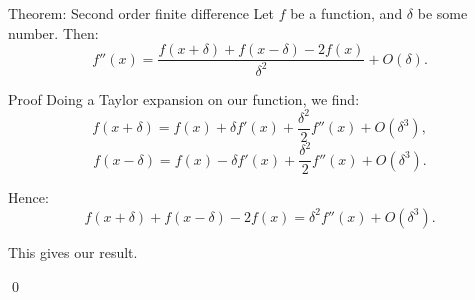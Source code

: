 \documentclass[a4paper]{article}
\begin{document}
\begin{parag}{Theorem: Second order finite difference}
    Let $f$ be a function, and $\delta$ be some number. Then:
    \[f''\left(x\right) = \frac{f\left(x + \delta\right) + f\left(x - \delta\right) - 2 f\left(x\right)}{\delta^2} + O\left(\delta\right).\]

    \begin{subparag}{Proof}
        Doing a Taylor expansion on our function, we find:
        \[f\left(x + \delta\right) = f\left(x\right) + \delta f'\left(x\right) + \frac{\delta^2}{2} f''\left(x\right) + O\left(\delta^3\right),\]
        \[f\left(x - \delta\right) = f\left(x\right) - \delta f'\left(x\right) + \frac{\delta^2}{2} f''\left(x\right) + O\left(\delta^3\right).\]

        Hence:
        \[f\left(x + \delta\right) + f\left(x - \delta\right)-  2 f\left(x\right) = \delta^2 f''\left(x\right) + O\left(\delta^3\right).\]

        This gives our result.

        \qed
    \end{subparag}
\end{parag}
\end{document}
